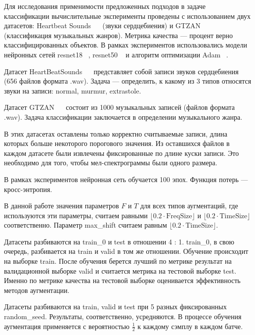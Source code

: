 \documentclass[12pt, fleqn]{article}
\begin{document}
Для исследования применимости предложенных подходов в задаче классификации вычислительные эксперименты проведены с использованием двух датасетов: Heartbeat Sounds ~\cite{HeartbeatSoundsArticle}~\cite{HeartbeatSoundsKaggle} (звуки сердцебиения) и GTZAN ~\cite{GTZAN_Article}~\cite{GTZAN_kaggle} (классификация музыкальных жанров). Метрика качества --- процент верно классифицированных объектов. В рамках экспериментов использовались модели нейронных сетей resnet18 ~\cite{Resnet}, resnet50 ~\cite{Resnet} и алгоритм оптимизации Adam ~\cite{Adam}. 
	
Датасет HeartBeatSounds ~\cite{HeartbeatSoundsArticle}~\cite{HeartbeatSoundsKaggle} представляет собой записи звуков сердцебиения (656 файлов формата .wav). Задача --- определить, к какому из 3 типов относятся звуки на записи: normal, murmur, extrastole.  
	
Датасет GTZAN ~\cite{GTZAN_Article}~\cite{GTZAN_kaggle} состоит из 1000 музыкальных записей (файлов формата .wav). Задача классификации заключается в определении музыкального жанра.
	
В этих датасетах оставлены только корректно считываемые записи, длина которых больше некоторого порогового значения. Из оставшихся файлов в каждом датасете были извлечены фиксированные по длине куски записи. Это необходимо для того, чтобы мел-спектрограммы были одного размера. 
	
В рамках экспериментов нейронная сеть обучается 100 эпох. Функция потерь --- кросс-энтропия. 
	
В данной работе значения параметров $F$ и $T$ для всех типов аугментаций, где используются эти параметры, считаем равными $ \lfloor 0.2 \cdot \text{FreqSize} \rfloor $ и $ \lfloor 0.2 \cdot \text{TimeSize} \rfloor$ соответственно. Параметр max\_shift считаем равным $ \lfloor 0.2 \cdot \text{TimeSize} \rfloor$.
	
Датасеты разбиваются на train\_0 и test в отношении 4 : 1. train\_0, в свою очередь, разбивается на train и valid в том же отношении. Обучение происходит на выборке train. После обучения берется лучший по метрике результат на валидационной выборке valid и считается метрика на тестовой выборке test. Именно по метрике качества на тестовой выборке оценивается эффективность методов аугментации.
	
Датасеты разбиваются на train, valid и test при 5 разных фиксированных random\_seed. Результаты, соответственно, усредняются. В процессе обучения аугментация применяется с вероятностью $\frac{1}{2}$ к каждому сэмплу в каждом батче.
\end{document}
